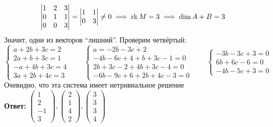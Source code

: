 $$
\begin{vmatrix}
	1 & 2 & 3 \\
    0 & 1 & 1 \\
    0 & 0 & 3
\end{vmatrix} =
\begin{vmatrix}
	1 & 1 \\
    0 & 3
\end{vmatrix} \ne 0 \implies \operatorname{rk} M = 3 \implies \dim A + B = 3 $$
Значит, одни из векторов ``лишний''. Проверим четвёртый:
$$
\begin{cases}
    a + 2b + 3c = 2 \\
    2a + b + 3c = 1 \\
    -a + 4b + 3c = 4 \\
    3a + 2b + 4c = 3
\end{cases} \qquad
\begin{cases}
    a = -2b - 3c + 2 \\
    -4b - 6c + 4 + b + 3c - 1 = 0 \\
    2b + 3c - 2 + 4b + 3c - 4 = 0 \\
    -6b - 9c + 6 + 2b + 4c - 3 = 0
\end{cases} \qquad
\begin{cases}
    -3b - 3c + 3 = 0 \\
    6b + 6c - 6 = 0 \\
    -4b - 5c + 3 = 0
\end{cases} $$
Очевидно, что эта система имеет нетривиальное решение \\
\textbf{Ответ:} $
\begin{pmatrix}
	1 \\
    2 \\
    -1 \\
    3
\end{pmatrix},
\begin{pmatrix}
	2 \\
    1 \\
    4 \\
    2
\end{pmatrix},
\begin{pmatrix}
	3 \\
    3 \\
    3 \\
    4
\end{pmatrix} $

